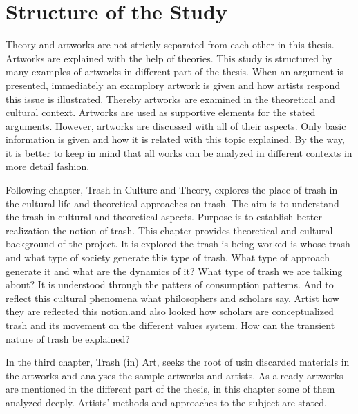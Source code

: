 


%
\section{Structure of the Study}
Theory and artworks are not strictly separated from each other in this thesis. Artworks are explained with the help of theories. This study is structured by many examples of artworks in different part of the thesis. When an argument is presented, immediately an examplory artwork is given and how artists respond this issue is illustrated. Thereby artworks are examined in the theoretical and cultural context. Artworks are used as supportive elements for the stated arguments. However, artworks are discussed with all of their aspects. Only basic information is given and how it is related with this topic explained. By the way, it is better to keep in mind that all works can be analyzed in different contexts in more detail fashion.

Following chapter, Trash in Culture and Theory, explores the place of trash in the cultural life and theoretical approaches on trash. The aim is to understand the trash in cultural and theoretical aspects. Purpose is to establish better realization the notion of trash. This chapter provides theoretical and cultural background of the project. It is explored the trash is being worked is whose trash and what type of society generate this type of trash. What type of approach generate it and what are the dynamics of it? What type of trash we are talking about? It is understood through the patters of consumption patterns. And to reflect this cultural phenomena what philosophers and scholars say. Artist how they are reflected this notion.and also looked how scholars are conceptualized trash and its movement on the different values system. How can the transient nature of trash be explained?

In the third chapter, Trash (in) Art, seeks the root of usin discarded materials in the artworks and analyses the sample artworks and artists. As already artworks are mentioned in the different part of the thesis, in this chapter some of them analyzed deeply. Artists' methods and approaches to the subject are stated.

